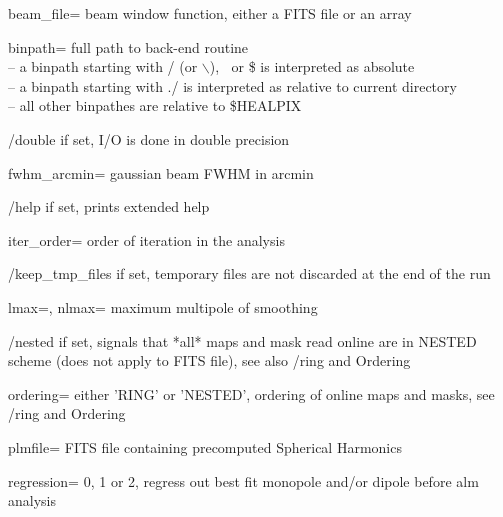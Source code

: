 \begin{keywords}
  \begin{kwlist}{} %
 \item[beam\_file=] beam window function, either a FITS file or an array

 \item[binpath=] full path to back-end routine \\
              -- a binpath starting with / (or $\backslash$), $~$ or \$ is interpreted as absolute\\
              -- a binpath starting with ./ is interpreted as relative to current directory\\
              -- all other binpathes are relative to \$HEALPIX

 \item[/double]    if set, I/O is done in double precision 

 \item[fwhm\_arcmin=] gaussian beam FWHM in arcmin 

 \item[/help]      if set, prints extended help

\item[iter\_order=] order of iteration in the analysis 

\item[/keep\_tmp\_files] if set, temporary files are not discarded at the end of the
                  run

 \item[lmax=, nlmax=]   maximum multipole of smoothing 

\item[/nested] if set, signals that *all* maps and mask read online are in
   NESTED scheme (does not apply to FITS file), see also /ring and Ordering

\item[ordering=] either 'RING' or 'NESTED', ordering of online maps and masks,
 see /ring and Ordering

\item[plmfile=] FITS file containing precomputed Spherical Harmonics 

\item[regression=] 0, 1 or 2, regress out best fit monopole and/or dipole before
    alm analysis


\end{kwlist}
\end{keywords}
